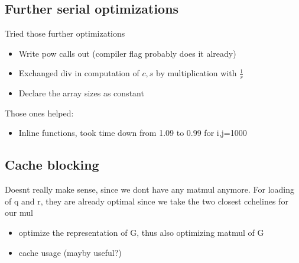 \documentclass[a4paper]{scrartcl}
\begin{document}
        \subsection{Further serial optimizations}
            Tried those further optimizations
            \begin{itemize}
                \item Write pow calls out (compiler flag probably does it already)
                \item Exchanged div in computation of $c,s$ by multiplication with $\frac{1}{r}$
                \item Declare the array sizes as constant
            \end{itemize}

            Those ones helped:
            \begin{itemize}
                \item Inline functions, took time down from 1.09 to 0.99 for i,j=1000
            \end{itemize}

        \subsection{Cache blocking}
            Doesnt really make sense, since we dont have any matmul anymore. 
            For loading of q and r, they are already optimal since we take the two closest cchelines for our mul






            \begin{itemize}
                \item optimize the representation of G, thus also optimizing matmul of G
                \item cache usage (mayby useful?)
            \end{itemize}
\end{document}
